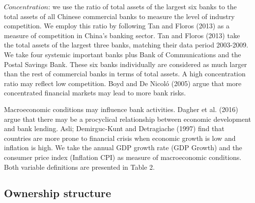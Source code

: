 \documentclass{article}
\begin{document}
\(Concentration\): we use the ratio of total assets of the largest six
banks to the total assets of all Chinese commercial banks to measure the
level of industry competition. We employ this ratio by following Tan and
Floros (2013) as a measure of competition in China's banking sector. Tan
and Floros (2013) take the total assets of the largest three banks,
matching their data period 2003-2009. We take four systemic important
banks plus Bank of Communications and the Postal Savings Bank. These six
banks individually are considered as much larger than the rest of
commercial banks in terms of total assets. A high concentration ratio
may reflect low competition. Boyd and De Nicoló (2005) argue that more
concentrated financial markets may lead to more bank risks.

Macroeconomic conditions may influence bank activities. Dagher et al.
(2016) argue that there may be a procyclical relationship between
economic development and bank lending. Asli; Demirguc-Kunt and
Detragiache (1997) find that countries are more prone to financial
crisis when economic growth is low and inflation is high. We take the
annual GDP growth rate (GDP Growth) and the consumer price index
(Inflation CPI) as measure of macroeconomic conditions. Both variable
definitions are presented in Table 2.

\hypertarget{ownership-structure}{%
\subsection{Ownership structure}\label{ownership-structure}}
\end{document}
